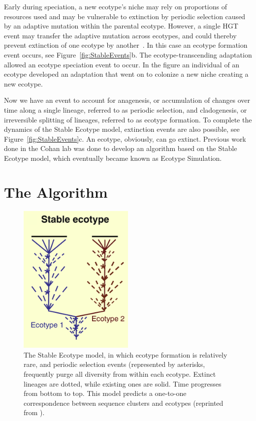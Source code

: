Early during speciation, a new ecotype's niche may rely on proportions of resources used and may be vulnerable to extinction by periodic selection caused by an adaptive mutation within the parental ecotype.
However, a single HGT event may transfer the adaptive mutation across ecotypes, and could thereby prevent extinction of one ecotype by another~\cite{cohan2008origins}.
In this case an ecotype formation event occurs, see Figure~\ref{fig:StableEvents}b.
The ecotype-transcending adaptation allowed an ecotype speciation event to occur. In the figure an individual of an ecotype developed an adaptation that went on to colonize a new niche creating a new ecotype.

Now we have an event to account for anagenesis, or accumulation of changes over time along a single lineage, referred to as periodic selection, and cladogenesis, or irreversible splitting of lineages, referred to as ecotype formation.
To complete the dynamics of the Stable Ecotype model, extinction events are also possible, see Figure~\ref{fig:StableEvents}c.
An ecotype, obviously, can go extinct.
Previous work done in the Cohan lab was done to develop an algorithm based on the Stable Ecotype model, which eventually became known as Ecotype Simulation.


\section{The Algorithm}

\begin{figure}
 \caption[Phylogenetic tree representation of typical Stable Ecotype model case \protect\cite{cohan2008origins}.]{ The Stable Ecotype model, in which ecotype formation is relatively rare, and periodic selection events (represented by asterisks, frequently purge all diversity from within each ecotype. Extinct lineages are dotted, while existing ones are solid. Time progresses from bottom to top. This model predicts a one-to-one correspondence between sequence clusters and ecotypes (reprinted from \protect\cite{cohan2008origins}). }
 \centering
 \label{fig:StableTree}
 \includegraphics[width=0.5\textwidth]{images/StableTree-CH2}
\end{figure}

